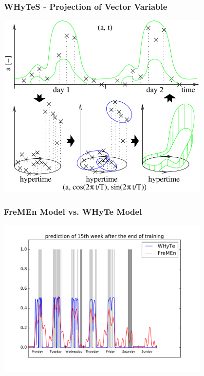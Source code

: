 \begin{frame}
	\frametitle{WHyTeS - Projection of Vector Variable}
    \vspace{3mm}
            \includegraphics[width=0.8\textwidth]{fig/hypertime_space.pdf}
\end{frame}



\begin{frame}
	\frametitle{FreMEn Model vs. WHyTe Model}
    \vspace{3mm}
            \includegraphics[width=0.8\textwidth]{fig/FreMEn_WHyTe.pdf}
\end{frame}




